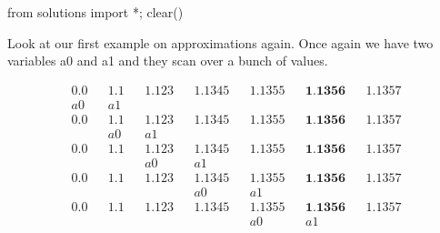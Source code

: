 \begin{python0}
from solutions import *; clear()
\end{python0}

Look at our first example on approximations again. Once again we have
two variables a0 and a1 and they scan over a bunch of values.

\begin{align*}
0.0         &&1.1       &&1.123      &&1.1345      &&1.1355     &&\textbf{1.1356} &&1.1357 \\
a0         &&a1 \\
0.0         &&1.1       &&1.123      &&1.1345      &&1.1355     &&\textbf{1.1356} &&1.1357 \\
&&a0        &&a1 \\
0.0         &&1.1       &&1.123      &&1.1345      &&1.1355     &&\textbf{1.1356} &&1.1357 \\
&&&&a0       &&a1 \\
0.0         &&1.1       &&1.123      &&1.1345      &&1.1355     &&\textbf{1.1356} &&1.1357 \\
&&&&&&a0      &&a1 \\
0.0         &&1.1       &&1.123      &&1.1345      &&1.1355     &&\textbf{1.1356} &&1.1357 \\
&&&&&&&&a0      &&a1 \\
\end{align*}

